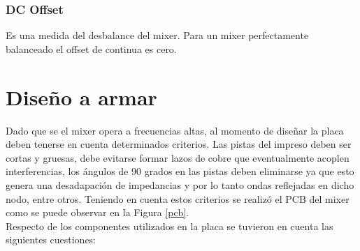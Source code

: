 \documentclass[a4paper,10pt]{article}
\begin{document}
	\subsubsection{DC Offset}
	\indent Es una medida del desbalance del mixer. Para un mixer perfectamente 
	balanceado el offset de continua es cero.

	\section{Diseño a armar}
	\indent Dado que se el mixer opera a frecuencias altas, al momento de 
	dise\~nar la placa deben tenerse en cuenta determinados criterios. Las 
	pistas del impreso deben ser cortas y gruesas, debe evitarse formar lazos de
	cobre que eventualmente acoplen interferencias, los \'angulos de 90 grados 
	en las pistas deben eliminarse ya que esto genera una desadapaci\'on de 
	impedancias y por lo tanto ondas reflejadas en dicho nodo, entre otros. 
	Teniendo en cuenta estos criterios se realiz\'o el PCB del mixer como se 
	puede observar en la Figura \ref{pcb}. \\
	
	\indent Respecto de los componentes utilizados en la placa se tuvieron en 
	cuenta las siguientes cuestiones:
\end{document}
